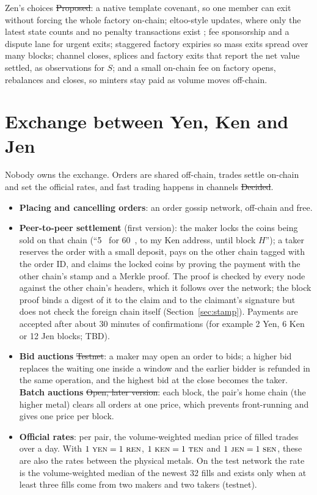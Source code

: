Zen's choices \st{Proposed}: a native template covenant, so one member can exit without forcing the whole factory on-chain; eltoo-style updates, where only the latest state counts and no penalty transactions exist \cite{eltoo}; fee sponsorship and a dispute lane for urgent exits; staggered factory expiries so mass exits spread over many blocks; channel closes, splices and factory exits that report the net value settled, as observations for $S$; and a small on-chain fee on factory opens, rebalances and closes, so minters stay paid as volume moves off-chain.

\section{Exchange between Yen, Ken and Jen}\label{sec:exchange}

Nobody owns the exchange. Orders are shared off-chain, trades settle on-chain and set the official rates, and fast trading happens in channels \st{Decided}.

\begin{itemize}
\item \textbf{Placing and cancelling orders}: an order gossip network, off-chain and free.
\item \textbf{Peer-to-peer settlement} (first version): the maker locks the coins being sold on that chain (``5~\YEN{} for 60~\KEN, to my Ken address, until block $H$''); a taker reserves the order with a small deposit, pays on the other chain tagged with the order ID, and claims the locked coins by proving the payment with the other chain's stamp and a Merkle proof. The proof is checked by every node against the other chain's headers, which it follows over the network; the block proof binds a digest of it to the claim and to the claimant's signature but does not check the foreign chain itself (Section~\ref{sec:stamp}). Payments are accepted after about 30 minutes of confirmations (for example 2 Yen, 6 Ken or 12 Jen blocks; TBD).
\item \textbf{Bid auctions} \st{Testnet}: a maker may open an order to bids; a higher bid replaces the waiting one inside a window and the earlier bidder is refunded in the same operation, and the highest bid at the close becomes the taker. \textbf{Batch auctions} \st{Open, later version}: each block, the pair's home chain (the higher metal) clears all orders at one price, which prevents front-running and gives one price per block.
\item \textbf{Official rates}: per pair, the volume-weighted median price of filled trades over a day. With $1~\textsc{yen}=1~\textsc{ren}$, $1~\textsc{ken}=1~\textsc{ten}$ and $1~\textsc{jen}=1~\textsc{sen}$, these are also the rates between the physical metals. On the test network the rate is the volume-weighted median of the newest 32 fills and exists only when at least three fills come from two makers and two takers (testnet).
\end{itemize}


